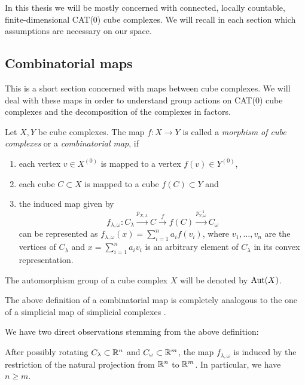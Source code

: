 \begin{rem}
  In this thesis we will be mostly concerned with connected, locally countable, finite-dimensional CAT(0) cube complexes. We will recall in each section which assumptions are necessary on our space.
\end{rem}

\subsection{Combinatorial maps}
\label{sec:comb-map}

This is a short section concerned with maps between cube complexes. We will deal with these maps in order to understand group actions on CAT(0) cube complexes and the decomposition of the complexes in factors.

\begin{defin}
  \label{def:morphism-ccc}
  Let \(X,Y\) be cube complexes. The map \(f\colon X \to Y\) is called a \emph{morphism of cube complexes} or a \emph{combinatorial map}, if
  \begin{enumerate}
  \item each vertex \(v \in X^{(0)}\) is mapped to a vertex \(f(v) \in Y^{(0)}\),
  \item each cube \(C \subset X\) is mapped to a cube \(f(C) \subset Y\) and
  \item the induced map given by
    \[
      f_{\lambda, \omega}\colon C_\lambda \xrightarrow{p_{X,\lambda}} C \xrightarrow{f} f(C) \xrightarrow{p^{-1}_{Y,\omega}} C_\omega
    \]
    can be represented as \(f_{\lambda,\omega}(x) = \sum_{i=1}^n a_i f(v_i)\), where \(v_1, \dots, v_n\) are the vertices of \(C_\lambda\) and \(x = \sum_{i=1}^n a_i v_i\) is an arbitrary element of \(C_\lambda\) in its convex representation.
  \end{enumerate}
  The automorphism group of a cube complex \(X\) will be denoted by \(\operatorname{Aut}(X)\).
\end{defin}

\begin{rem}
  The above definition of a combinatorial map is completely analogous to the one of a simplicial map of simplicial complexes \cite[][c.\,f.]{Singer}.
\end{rem}

We have two direct observations stemming from the above definition:

\begin{lemma}
  After possibly rotating \(C_\lambda \subset \mathbb{R}^n\) and \(C_\omega \subset \mathbb{R}^m\), the map \(f_{\lambda, \omega}\) is induced by the restriction of the natural projection from \(\mathbb{R}^n\) to \(\mathbb{R}^m\). In particular, we have \(n \geq m\).
\end{lemma}

